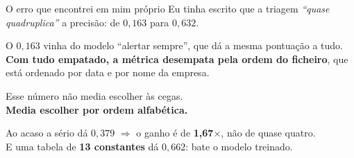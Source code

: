 \documentclass[aspectratio=169]{beamer}
\begin{document}
\begin{frame}{O erro que encontrei em mim próprio}
Eu tinha escrito que a triagem \emph{``quase quadruplica''} a precisão: de $0{,}163$ para $0{,}632$.
\vspace{3mm}

O $0{,}163$ vinha do modelo ``alertar sempre'', que dá a mesma pontuação a tudo.\\
\textbf{Com tudo empatado, a métrica desempata pela ordem do ficheiro}, que está ordenado por data
e por nome da empresa.
\vspace{3mm}
\begin{center}
\large Esse número não media escolher às cegas.\\
\textbf{Media escolher por ordem alfabética.}
\end{center}
\vspace{3mm}
\footnotesize
Ao acaso a sério dá $0{,}379$ $\Rightarrow$ o ganho é de \textbf{1{,}67$\times$}, não de quase quatro.\\
E uma tabela de \textbf{13 constantes} dá $0{,}662$: bate o modelo treinado.
\end{frame}
\end{document}
